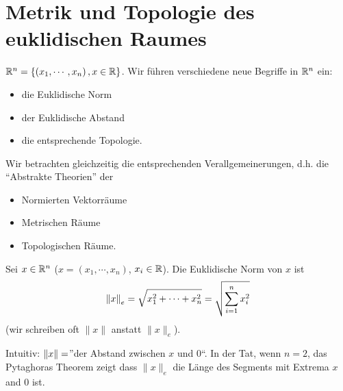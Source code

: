 \section{Metrik und Topologie des euklidischen Raumes}
$\mathbb{R}^n=\left\{ \left( x_1,\cdots,x_n \right), x\in\mathbb{R} \right\}$.
Wir f\"uhren verschiedene neue Begriffe in $\mathbb{R}^n$ ein:
\begin{itemize}
  \item die Euklidische Norm
  \item der Euklidische Abstand
  \item die entsprechende Topologie.
\end{itemize}
Wir betrachten gleichzeitig die entsprechenden Verallgemeinerungen,
d.h. die ``Abstrakte Theorien'' der
\begin{itemize}
  \item Normierten Vektorr\"aume
  \item Metrischen R\"aume
  \item Topologischen R\"aume.
\end{itemize}
\begin{Def}
  Sei $x\in\mathbb{R}^n$ ($x=(x_1,\cdots,x_n)$, $x_i\in\mathbb{R}$). Die Euklidische Norm
von $x$ ist 
  \[\left\| x \right\|_e=\sqrt{x_1^2+\cdots+x_n^2}=\sqrt{\sum_{i=1}^nx_i^2}\]
(wir schreiben oft $\|x\|$ anstatt $\|x\|_e$).
\end{Def}

Intuitiv: $\left\| x \right\|=$''der Abstand zwischen $x$ und 0``.  In der Tat, wenn $n=2$,
das Pytaghoras Theorem zeigt dass $\|x\|_e$ die L\"ange des Segments mit Extrema
$x$ and $0$ ist. 

